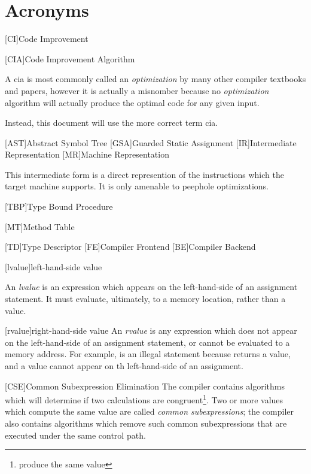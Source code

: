 \chapter{Acronyms}

\begin{acronym}
  [CI]{Code Improvement}

  [CIA]{Code Improvement Algorithm}

  A \acs{cia} is most commonly called an \emph{optimization} by many
  other compiler textbooks and papers, however it is actually a
  misnomber because no \emph{optimization} algorithm will actually
  produce the optimal code for any given input.

  Instead, this document will use the more correct term \ac{cia}.
  
  [AST]{Abstract Symbol Tree}
  [GSA]{Guarded Static Assignment}
  [IR]{Intermediate Representation}
  [MR]{Machine Representation}
  
  This intermediate form is a direct represention of the instructions
  which the target machine supports.  It is only amenable to peephole
  optimizations.

  [TBP]{Type Bound Procedure}
  
  [MT]{Method Table}
  
  [TD]{Type Descriptor}
  [FE]{Compiler Frontend}
  [BE]{Compiler Backend}

  [lvalue]{left-hand-side value}
  
  An \emph{lvalue} is an expression which appears on the
  left-hand-side of an assignment statement.  It must evaluate,
  ultimately, to a memory location, rather than a value.

  [rvalue]{right-hand-side value}
  An \emph{rvalue} is any expression which does not appear on the
  left-hand-side of an assignment statement, or cannot be evaluated to
  a memory address.  For example,  is an
  illegal statement because  returns a 
  value, and a value cannot appear on th left-hand-side of an
  assignment.

  [CSE]{Common Subexpression Elimination}
  The compiler contains algorithms which will determine if two
  calculations are congruent\footnote{produce the same value}.  Two or
  more values which compute the same value are called \emph{common
    subexpressions}; the compiler also contains algorithms which
  remove such common subexpressions that are executed under the same
  control path.


\end{acronym}
